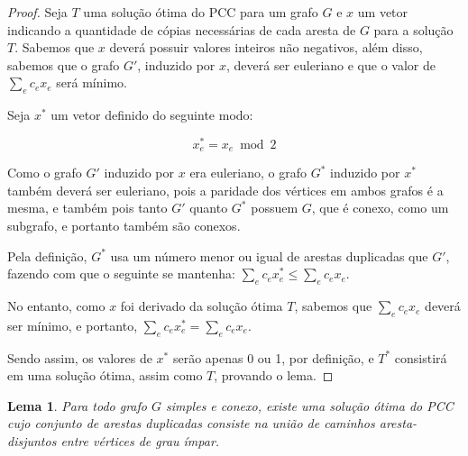 \documentclass[12pt, a4paper]{article}
\newtheorem{lemma}{Lema}
\begin{document}
\begin{proof}
    Seja $T$ uma solução ótima do PCC para um grafo $G$ e $x$ um vetor indicando a quantidade de cópias necessárias de cada aresta de $G$ para a solução $T$. 
    Sabemos que $x$ deverá possuir valores inteiros não negativos, além disso, sabemos que o grafo $G'$, induzido por $x$, deverá ser euleriano e que o valor de $\sum_e c_ex_e$ será mínimo.

    Seja $x^*$ um vetor definido do seguinte modo:

    \[  x^*_e = x_e \bmod 2    \]

    Como o grafo $G'$ induzido por $x$ era euleriano, o grafo $G^*$ induzido por $x^*$ também deverá ser euleriano, pois a paridade dos vértices em ambos grafos é a mesma, e também pois tanto $G'$ quanto $G^*$ possuem $G$, que é conexo, como um subgrafo, e portanto também são conexos.
    
    Pela definição, $G^*$ usa um número menor ou igual de arestas duplicadas que $G'$, fazendo com que o seguinte se mantenha: $\sum_e c_ex^*_e \leq \sum_e c_ex_e$.

    No entanto, como $x$ foi derivado da solução ótima $T$, sabemos que $\sum_e c_ex_e$ deverá ser mínimo, e portanto, $\sum_e c_ex^*_e = \sum_e c_ex_e$. 

    Sendo assim, os valores de $x^*$ serão apenas 0 ou 1, por definição, e $T^*$ consistirá em uma solução ótima, assim como $T$, provando o lema.

\end{proof}

\begin{lemma}
    Para todo grafo $G$ simples e conexo, existe uma solução ótima do PCC cujo conjunto de arestas duplicadas consiste na união de caminhos aresta-disjuntos entre vértices de grau ímpar.
\end{lemma}
\end{document}
